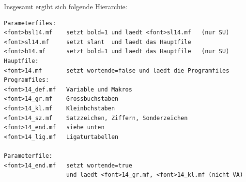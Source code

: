 \documentclass[12pt,titlepage]{article}
\begin{document}
Insgesamt ergibt sich folgende Hierarchie:
\begin{verbatim}
Parameterfiles:
<font>bsl14.mf    setzt bold=1 und laedt <font>sl14.mf   (nur SU)
<font>sl14.mf     setzt slant  und laedt das Hauptfile    
<font>b14.mf      setzt bold=1 und laedt das Hauptfile   (nur SU) 
Hauptfile:
<font>14.mf       setzt wortende=false und laedt die Programfiles
Programfiles:
<font>14_def.mf   Variable und Makros
<font>14_gr.mf    Grossbuchstaben
<font>14_kl.mf    Kleinbchstaben
<font>14_sz.mf    Satzzeichen, Ziffern, Sonderzeichen
<font>14_end.mf   siehe unten
<font>14_lig.mf   Ligaturtabellen

Parameterfile:
<font>14_end.mf   setzt wortende=true 
                  und laedt <font>14_gr.mf, <font>14_kl.mf (nicht VA)
\end{verbatim} 
\end{document}
